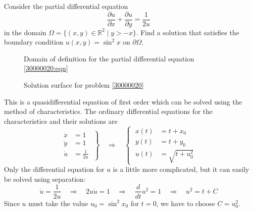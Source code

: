 Consider the partial differential equation
\begin{equation}
\frac{\partial u}{\partial x} + \frac{\partial u}{\partial y} = \frac{1}{2u}
\label{30000020:eqn}
\end{equation}
in the domain $\Omega = \{(x,y)\in\mathbb R^2\;|\; y>-x\}$. 
Find a solution that satisfies the boundary condition $u(x,y)=\sin^2 x$ on
$\partial\Omega$.

\begin{loesung}
\begin{figure}
\centering
{}
\caption{Domain of definition for the partial differential equation
\eqref{30000020:eqn}
\label{3000020:domain}}
\end{figure}
\begin{figure}
\centering
{}
\caption{Solution surface for problem \ref{30000020}
\label{30000020:solution}}
\end{figure}
This is a quasidifferential equation of first order which can be solved
using the method of characteristics.
The ordinary differential equations for the characteristics and their
solutions are
\begin{equation}
\left.
\begin{aligned}
\dot x &= 1
\\
\dot y &= 1
\\
\dot u &= \frac1{2u}
\end{aligned}
\;
\right\}
\quad\Rightarrow\quad
\left\{
\;
\begin{aligned}
x(t) &= t + x_0
\\
y(t) &= t + y_0
\\
u(t) &=\sqrt{t+u_0^2}
\end{aligned}
\right.
\label{30000020:char}
\end{equation}
Only the differential equation for $u$ is a little more complicated, but
it can easily be solved using separation:
\[
\dot{u}=\frac1{2u}
\quad\Rightarrow\quad
2u\dot u = 1
\quad\Rightarrow\quad
\frac{d}{dt}u^2=1
\quad\Rightarrow\quad
u^2 = t+C
\]
Since $u$ must take the value $u_0=\sin^2 x_0$ for $t=0$,
we have to choose $C=u_0^2$.


\end{loesung}
